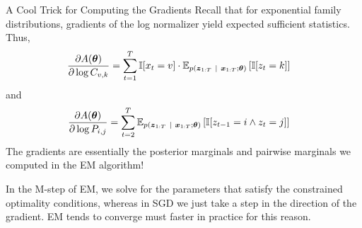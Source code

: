 \documentclass[aspectratio=169]{beamer}
\begin{document}
\begin{frame}[t,allowframebreaks]{A Cool Trick for Computing the
    Gradients}\label{a-cool-trick-for-computing-the-gradients}
Recall that for exponential family distributions, gradients of the log
normalizer yield expected sufficient statistics. Thus, 
\begin{align*}
\frac{\partial A(\boldsymbol{\theta})}{\partial \log C_{v,k}} 
&= \sum_{t=1}^T \mathbb{I}[x_{t} = v] \cdot \mathbb{E}_{p(\boldsymbol{z}_{1:T} ~\vert~ \boldsymbol{x}_{1:T}; \boldsymbol{\theta})} \left[\mathbb{I}[z_{t}=k] \right]
\end{align*} 
and 
\begin{align*}
\frac{\partial A(\boldsymbol{\theta})}{\partial \log P_{i,j}} 
&= \sum_{t=2}^T \mathbb{E}_{p(\boldsymbol{z}_{1:T} ~\vert~ \boldsymbol{x}_{1:T}; \boldsymbol{\theta})} \left[ \mathbb{I}[z_{t-1}=i \wedge z_{t} = j] \right]
\end{align*} 
The gradients are essentially the posterior marginals and
pairwise marginals we computed in the EM algorithm!

In the M-step of EM, we solve for the parameters that satisfy the
constrained optimality conditions, whereas in SGD we just take a step in
the direction of the gradient. EM tends to converge must faster in
practice for this reason.
\end{frame}
\end{document}
